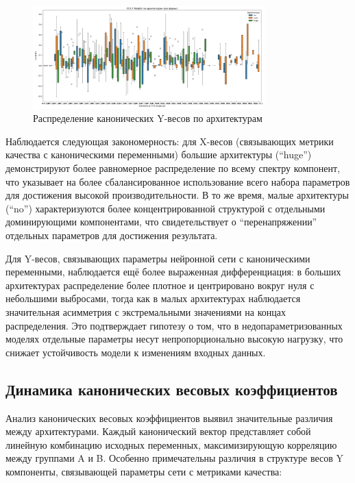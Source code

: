 \documentclass[a4paper,12pt]{article}
\begin{document}
\begin{figure}[ht]
  \centering
  \includegraphics[width=0.8\textwidth]{cca_y_weights_all_shapes.pdf}
  \caption{Распределение канонических Y-весов по архитектурам}
  \label{fig:cca_y_weights}
\end{figure}

Наблюдается следующая закономерность: для X-весов (связывающих метрики качества с каноническими переменными)
большие архитектуры (``huge'') демонстрируют более равномерное распределение по всему спектру компонент, что
указывает на более сбалансированное использование всего набора параметров для достижения высокой
производительности. В то же время, малые архитектуры (``no'') характеризуются более концентрированной
структурой с отдельными доминирующими компонентами, что свидетельствует о ``перенапряжении'' отдельных
параметров для достижения результата.

Для Y-весов, связывающих параметры нейронной сети с каноническими переменными, наблюдается ещё более
выраженная дифференциация: в больших архитектурах распределение более плотное и центрировано вокруг нуля с
небольшими выбросами, тогда как в малых архитектурах наблюдается значительная асимметрия с экстремальными
значениями на концах распределения. Это подтверждает гипотезу о том, что в недопараметризованных моделях
отдельные параметры несут непропорционально высокую нагрузку, что снижает устойчивость модели к изменениям
входных данных.

\subsection{Динамика канонических весовых коэффициентов}

Анализ канонических весовых коэффициентов выявил значительные различия между архитектурами. Каждый
канонический вектор представляет собой линейную комбинацию исходных переменных, максимизирующую корреляцию
между группами A и B. Особенно примечательны различия в структуре весов Y компоненты, связывающей параметры
сети с метриками качества:
\end{document}
